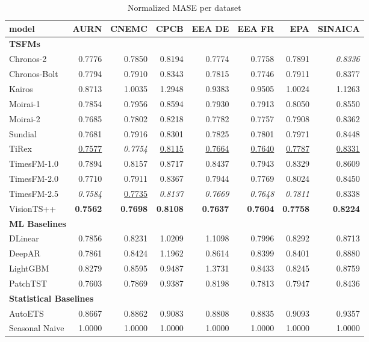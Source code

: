 \begin{table}[H]
\caption{Normalized MASE per dataset}
\centering
\begin{small}
\begin{tabular}{lrrrrrrr}
\toprule
model & AURN & CNEMC & CPCB & EEA DE & EEA FR & EPA & SINAICA \\
\midrule
\multicolumn{8}{l}{\textbf{TSFMs}} \\
Chronos-2 & 0.7776 & 0.7850 & 0.8194 & 0.7774 & 0.7758 & 0.7891 & \textit{0.8336} \\
Chronos-Bolt & 0.7794 & 0.7910 & 0.8343 & 0.7815 & 0.7746 & 0.7911 & 0.8377 \\
Kairos & 0.8713 & 1.0035 & 1.2948 & 0.9383 & 0.9505 & 1.0024 & 1.1263 \\
Moirai-1 & 0.7854 & 0.7956 & 0.8594 & 0.7930 & 0.7913 & 0.8050 & 0.8550 \\
Moirai-2 & 0.7685 & 0.7802 & 0.8218 & 0.7782 & 0.7757 & 0.7908 & 0.8362 \\
Sundial & 0.7681 & 0.7916 & 0.8301 & 0.7825 & 0.7801 & 0.7971 & 0.8448 \\
TiRex & \underline{0.7577} & \textit{0.7754} & \underline{0.8115} & \underline{0.7664} & \underline{0.7640} & \underline{0.7787} & \underline{0.8331} \\
TimesFM-1.0 & 0.7894 & 0.8157 & 0.8717 & 0.8437 & 0.7943 & 0.8329 & 0.8609 \\
TimesFM-2.0 & 0.7710 & 0.7911 & 0.8367 & 0.7944 & 0.7769 & 0.8024 & 0.8450 \\
TimesFM-2.5 & \textit{0.7584} & \underline{0.7735} & \textit{0.8137} & \textit{0.7669} & \textit{0.7648} & \textit{0.7811} & 0.8338 \\
VisionTS++ & \textbf{0.7562} & \textbf{0.7698} & \textbf{0.8108} & \textbf{0.7637} & \textbf{0.7604} & \textbf{0.7758} & \textbf{0.8224} \\
\midrule
\multicolumn{8}{l}{\textbf{ML Baselines}} \\
DLinear & 0.7856 & 0.8231 & 1.0209 & 1.1098 & 0.7996 & 0.8292 & 0.8713 \\
DeepAR & 0.7861 & 0.8424 & 1.1962 & 0.8614 & 0.8399 & 0.8401 & 0.8880 \\
LightGBM & 0.8279 & 0.8595 & 0.9487 & 1.3731 & 0.8433 & 0.8245 & 0.8759 \\
PatchTST & 0.7603 & 0.7869 & 0.9387 & 0.8198 & 0.7813 & 0.7947 & 0.8436 \\
\midrule
\multicolumn{8}{l}{\textbf{Statistical Baselines}} \\
AutoETS & 0.8667 & 0.8862 & 0.9083 & 0.8808 & 0.8835 & 0.9093 & 0.9357 \\
Seasonal Naive & 1.0000 & 1.0000 & 1.0000 & 1.0000 & 1.0000 & 1.0000 & 1.0000 \\
\bottomrule
\end{tabular}
\end{small}
\end{table}